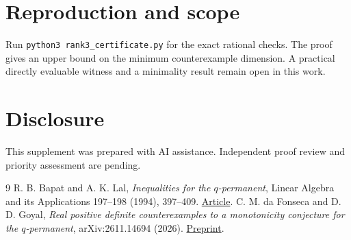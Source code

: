 \documentclass[11pt]{article}
\begin{document}
\section{Reproduction and scope}

Run \texttt{python3 rank3\_certificate.py} for the exact rational checks. The proof gives an upper bound on the minimum counterexample dimension. A practical directly evaluable witness and a minimality result remain open in this work.

\section*{Disclosure}
This supplement was prepared with AI assistance. Independent proof review and priority assessment are pending.

\begin{thebibliography}{9}
 R. B. Bapat and A. K. Lal, \emph{Inequalities for the $q$-permanent}, Linear Algebra and its Applications 197--198 (1994), 397--409. \href{https://doi.org/10.1016/0024-3795(94)90497-9}{Article}.
 C. M. da Fonseca and D. D. Goyal, \emph{Real positive definite counterexamples to a monotonicity conjecture for the $q$-permanent}, arXiv:2611.14694 (2026). \href{https://arxiv.org/abs/2611.14694}{Preprint}.
\end{thebibliography}
\end{document}
